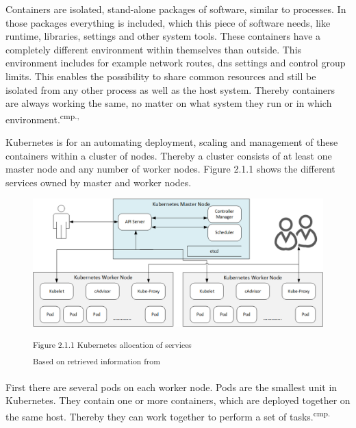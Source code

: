 
Containers are isolated, stand-alone packages of software, similar to processes. In those packages everything is included, which this piece of software needs, like runtime, libraries, settings and other system tools.  These containers have a completely different environment within themselves than outside. This environment includes for example network routes, dns settings and control group limits. This enables the possibility to share common resources and still be isolated from any other process as well as the host system. Thereby containers are always working the same, no matter on what system they run or in which environment.\textsuperscript{cmp.\cite{13}, \cite{14}}


Kubernetes is for an automating deployment, scaling and management of these containers within a cluster of nodes. Thereby a cluster consists of at least one master node and any number of worker nodes. Figure 2.1.1 shows the different services owned by master and worker nodes.

\begin{figure}[h]
\centering
\includegraphics[width=\textwidth/5*3]{images/kubernetes_service_allocation.png}

\textsuperscript{Figure 2.1.1 Kubernetes allocation of services}\\
\textsuperscript{Based on retrieved information from \cite{13}}
\end{figure}

First there are several pods on each worker node. Pods are the smallest unit in Kubernetes. They contain one or more containers, which are deployed together on the same host. Thereby they can work together to perform a set of tasks.\textsuperscript{cmp.\cite{15}}%

